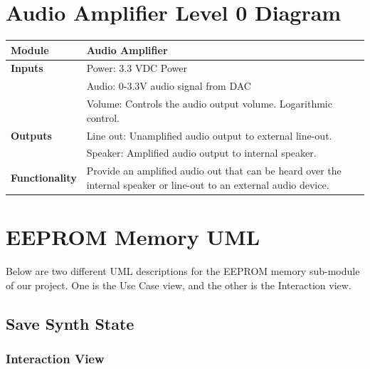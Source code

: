 \documentclass{article}
\begin{document}
\section{Audio Amplifier Level 0 Diagram}

\begin{tabular}{|p{1in}|p{5in}|}
\hline
\textbf{Module} & Audio Amplifier \\
\hline
\textbf{Inputs} & Power: 3.3 VDC Power\\
	      & Audio: 0-3.3V audio signal from DAC\\
	      & Volume: Controls the audio output volume. Logarithmic control.\\
\hline
\textbf{Outputs}& Line out: Unamplified audio output to external line-out.\\ 
	      & Speaker: Amplified audio output to internal speaker.\\
\hline
\textbf{Functionality}& Provide an amplified audio out that can be heard over the internal speaker or line-out to an external audio device.\\
\hline
\end{tabular}

\newpage

\section{EEPROM Memory UML}
Below are two different UML descriptions for the EEPROM memory sub-module of our project. One is the Use Case view, and the other is the Interaction view.

\subsection{Save Synth State}
\subsubsection{Interaction View}
\end{document}

